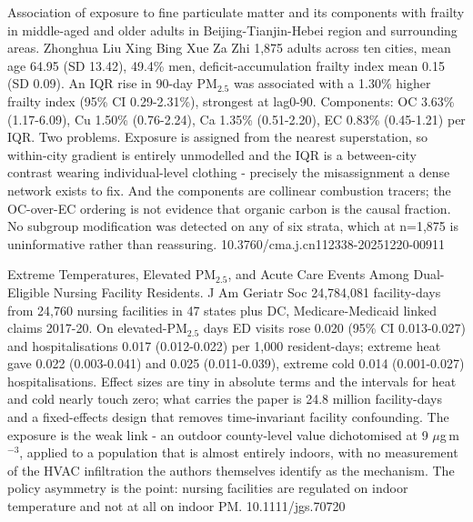 \documentclass[10pt]{article}
\begin{document}
{Association of exposure to fine particulate matter and its components with frailty in middle-aged and older adults in Beijing-Tianjin-Hebei region and surrounding areas.}
{Zhonghua Liu Xing Bing Xue Za Zhi}
{1,875 adults across ten cities, mean age 64.95 (SD 13.42), 49.4\% men, deficit-accumulation frailty index mean 0.15 (SD 0.09). An IQR rise in 90-day PM$_{2.5}$ was associated with a 1.30\% higher frailty index (95\% CI 0.29-2.31\%), strongest at lag0-90. Components: OC 3.63\% (1.17-6.09), Cu 1.50\% (0.76-2.24), Ca 1.35\% (0.51-2.20), EC 0.83\% (0.45-1.21) per IQR. Two problems. Exposure is assigned from the nearest superstation, so within-city gradient is entirely unmodelled and the IQR is a between-city contrast wearing individual-level clothing - precisely the misassignment a dense network exists to fix. And the components are collinear combustion tracers; the OC-over-EC ordering is not evidence that organic carbon is the causal fraction. No subgroup modification was detected on any of six strata, which at n=1,875 is uninformative rather than reassuring.}
{10.3760/cma.j.cn112338-20251220-00911}

{Extreme Temperatures, Elevated PM$_{2.5}$, and Acute Care Events Among Dual-Eligible Nursing Facility Residents.}
{J Am Geriatr Soc}
{24,784,081 facility-days from 24,760 nursing facilities in 47 states plus DC, Medicare-Medicaid linked claims 2017-20. On elevated-PM$_{2.5}$ days ED visits rose 0.020 (95\% CI 0.013-0.027) and hospitalisations 0.017 (0.012-0.022) per 1,000 resident-days; extreme heat gave 0.022 (0.003-0.041) and 0.025 (0.011-0.039), extreme cold 0.014 (0.001-0.027) hospitalisations. Effect sizes are tiny in absolute terms and the intervals for heat and cold nearly touch zero; what carries the paper is 24.8 million facility-days and a fixed-effects design that removes time-invariant facility confounding. The exposure is the weak link - an outdoor county-level value dichotomised at 9 $\mu$g\,m$^{-3}$, applied to a population that is almost entirely indoors, with no measurement of the HVAC infiltration the authors themselves identify as the mechanism. The policy asymmetry is the point: nursing facilities are regulated on indoor temperature and not at all on indoor PM.}
{10.1111/jgs.70720}
\end{document}
